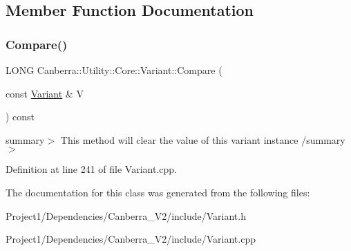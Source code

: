 \subsection{Member Function Documentation}
\mbox{\label{class_canberra_1_1_utility_1_1_core_1_1_variant_abd010f8e9411a9cbd7fd8be1f76fd4b4_abd010f8e9411a9cbd7fd8be1f76fd4b4}} 
\subsubsection{\texorpdfstring{Compare()}{Compare()}}
{\footnotesize\ttfamily L\+O\+NG Canberra\+::\+Utility\+::\+Core\+::\+Variant\+::\+Compare (\begin{DoxyParamCaption}\item[{const \hyperlink{class_canberra_1_1_utility_1_1_core_1_1_variant}{Variant} \&}]{V }\end{DoxyParamCaption}) const}

summary$>$ This method will clear the value of this variant instance /summary$>$ 

Definition at line 241 of file Variant.\+cpp.



The documentation for this class was generated from the following files\+:\begin{DoxyCompactItemize}
\item 
Project1/\+Dependencies/\+Canberra\+\_\+\+V2/include/Variant.\+h\item 
Project1/\+Dependencies/\+Canberra\+\_\+\+V2/include/Variant.\+cpp\end{DoxyCompactItemize}
